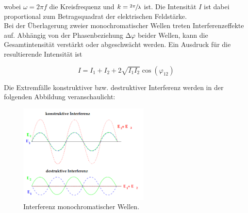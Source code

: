\noindent wobei $\omega = 2\pi{}f$ die Kreisfrequenz und $k = \sfrac{2\pi}{\lambda}$ ist. Die Intensität $I$ ist dabei proportional 
zum Betragsquadrat der elektrischen Feldstärke.\\

\noindent Bei der Überlagerung zweier monochromatischer Wellen treten Interferenzeffekte auf. Abhängig von der Phasenbeziehung $\increment\varphi$
beider Wellen, kann die Gesamtintensität verstärkt oder abgeschwächt werden. Ein Ausdruck für die resultierende Intensität ist 

\begin{equation}
\label{eqn:Intensitaet}
    I = I_1 + I_2 + 2\sqrt{I_1I_2}\cos\left(\varphi_{12}\right)
\end{equation}

\noindent Die Extremfälle konstruktiver bzw. destruktiver Interferenz werden in der folgenden Abbildung veranschaulicht:

\begin{figure}
    \centering
    \includegraphics[height=5cm]{Interferenz.png}
    \caption{Interferenz monochromatischer Wellen\cite{Versuchsanleitung_v401}.}
    \label{fig:Interferenz}
\end{figure}

